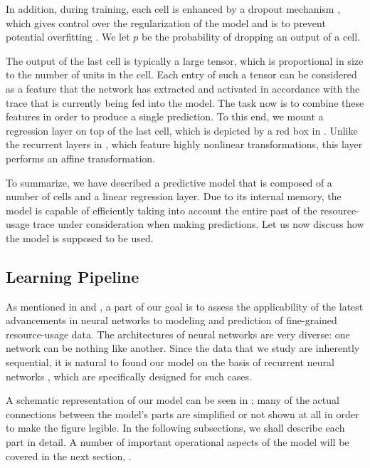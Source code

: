 In addition, during training, each cell is enhanced by a dropout mechanism
\cite{zaremba2014}, which gives control over the regularization of the model and
is to prevent potential overfitting \cite{hastie2013}. We let $p$ be the
probability of dropping an output of a cell.

The output of the last cell is typically a large tensor, which is proportional
in size to the number of units in the cell. Each entry of such a tensor can be
considered as a feature that the network has extracted and activated in
accordance with the trace that is currently being fed into the model. The task
now is to combine these features in order to produce a single prediction. To
this end, we mount a regression layer on top of the last cell, which is depicted
by a red box in . Unlike the recurrent layers in ,
which feature highly nonlinear transformations, this layer performs an affine
transformation.

To summarize, we have described a predictive model that is composed of a number
of  cells and a linear regression layer. Due to its internal memory,
the model is capable of efficiently taking into account the entire past of the
resource-usage trace under consideration when making predictions. Let us now
discuss how the model is supposed to be used.

\subsection{Learning Pipeline}

As mentioned in  and , a part of our goal is to
assess the applicability of the latest advancements in neural networks
\cite{goodfellow2016} to modeling and prediction of fine-grained resource-usage
data. The architectures of neural networks are very diverse: one network can be
nothing like another. Since the data that we study are inherently sequential, it
is natural to found our model on the basis of recurrent neural networks
\cite{goodfellow2016}, which are specifically designed for such cases.

A schematic representation of our model can be seen in ; many of the
actual connections between the model's parts are simplified or not shown at all
in order to make the figure legible. In the following subsections, we shall
describe each part in detail. A number of important operational aspects of the
model will be covered in the next section, .

